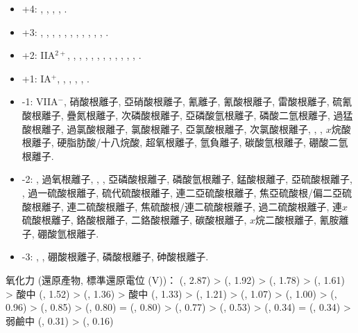 \documentclass[a4paper,12pt]{report}
\begin{document}
\begin{itemize}
\item +4: , , , , .
\item +3: , , , , , , , , , , , .
\item +2: IIA$^{2+}$, , , , , , , , , , , , .
\item +1: IA$^+$, , , , , .
\item -1: VIIA$^-$, 硝酸根離子, 亞硝酸根離子, 氰離子, 氰酸根離子, 雷酸根離子, 硫氰酸根離子, 疊氮根離子, 次磷酸根離子, 亞磷酸氫根離子, 磷酸二氫根離子, 過猛酸根離子, 過氯酸根離子, 氯酸根離子, 亞氯酸根離子, 次氯酸根離子, , , $x$烷酸根離子, 硬脂肪酸/十八烷酸, 超氧根離子, 氫負離子, 碳酸氫根離子, 硼酸二氫根離子.
\item -2: , 過氧根離子, , , 亞磷酸根離子, 磷酸氫根離子, 錳酸根離子, 亞硫酸根離子, , 過一硫酸根離子, 硫代硫酸根離子, 連二亞硫酸根離子, 焦亞硫酸根/偏二亞硫酸根離子, 連二硫酸根離子, 焦硫酸根/連二硫酸根離子, 過二硫酸根離子, 連$x$硫酸根離子, 鉻酸根離子, 二鉻酸根離子, 碳酸根離子, $x$烷二酸根離子, 氰胺離子, 硼酸氫根離子.
\item -3: , , 硼酸根離子, 磷酸根離子, 砷酸根離子.
\end{itemize}
氧化力 (還原產物, 標準還原電位 (V))： (, 2.87) >  (, 1.92) >  (, 1.78) >  (, 1.61) > 酸中  (, 1.52) >  (, 1.36) > 酸中  (, 1.33) >  (, 1.21) >  (, 1.07) >  (, 1.00) >  (, 0.96) >  (, 0.85) >  (, 0.80) =  (, 0.80) >  (, 0.77) >  (, 0.53) >  (, 0.34) =  (, 0.34) > 弱鹼中  (, 0.31) >  (, 0.16)
\end{document}
